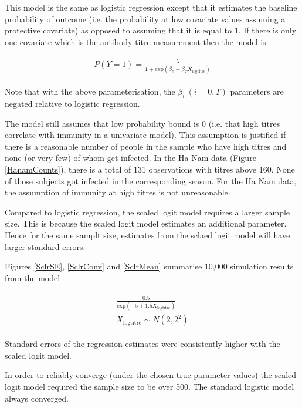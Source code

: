 This model is the same as logistic regression except that it estimates the baseline probability of outcome (i.e. the probability at low covariate values assuming a protective covariate) as opposed to assuming that it is equal to 1. If there is only one covariate which is the antibody titre measurement then the model is

\begin{align*}
\begin{gathered}
P(Y=1) = \frac{\lambda}{1 + \text{exp}(\beta_0 + \beta_T X_{\text{logtitre}})}
\end{gathered}
\end{align*}

Note that with the above parameterisation, the $\beta_i \ (i=0,T)$ parameters are negated relative to logistic regression.

The model still assumes that low probability bound is 0 (i.e. that high titres correlate with immunity in a univariate model). This assumption is justified if there is a reasonable number of people in the sample who have high titres and none (or very few) of whom get infected. In the Ha Nam data (Figure \ref{HanamCounts}), there is a total of 131 observations with titres above 160. None of those subjects got infected in the corresponding season. For the Ha Nam data, the assumption of immunity at high titres is not unreasonable.

Compared to logistic regression, the scaled logit model requires a larger sample size. This is because the scaled logit model estimates an additional parameter. Hence for the same samplt size, estimates from the sclaed logit model will have larger standard errors. 

Figures \ref{SclrSE}, \ref{SclrConv} and \ref{SclrMean} summarise 10,000 simulation results from the model 

\begin{align*}
\begin{gathered}
\frac{0.5}{\text{exp}(-5 + 1.5 X_{\text{logtitre}})} \\
X_{\text{logtitre}} \sim N(2, 2^2)
\end{gathered}
\end{align*}

Standard errors of the regression estimates were consistently higher with the scaled logit model.

In order to reliably converge (under the chosen true parameter values) the scaled logit model required the sample size to be over 500. The standard logistic model always converged.


